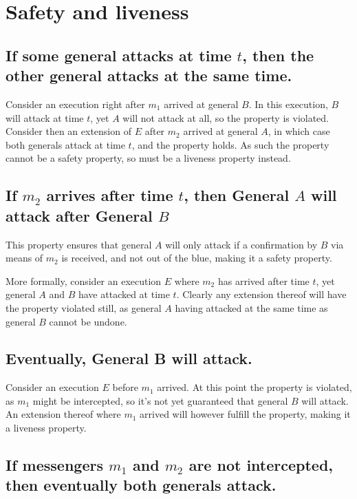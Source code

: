 \documentclass[a4paper]{scrreprt}
\begin{document}
\section{Safety and liveness}
\label{seq:safety_liveness}

\subsection{If some general attacks at time $t$, then the other general attacks at the same time.}
\label{seq:liveness_property}

Consider an execution right after $m_1$ arrived at general $B$. In this
execution, $B$ will attack at time $t$, yet $A$ will not attack at all, so the
property is violated. Consider then an extension of $E$ after $m_2$ arrived at
general $A$, in which case both generals attack at time $t$, and the property
holds. As such the property cannot be a safety property, so must be a liveness
property instead.

\subsection{If $m_2$ arrives after time $t$, then General $A$ will attack after General $B$}
\label{seq:no_unconfirmed_attack_safety}

This property ensures that general $A$ will only attack if a confirmation by
$B$ via means of $m_2$ is received, and not out of the blue, making it a safety
property.

More formally, consider an execution $E$ where $m_2$ has arrived after time
$t$, yet general $A$ and $B$ have attacked at time $t$. Clearly any extension
thereof will have the property violated still, as general $A$ having attacked
at the same time as general $B$ cannot be undone.

\subsection{Eventually, General B will attack.}

Consider an execution $E$ before $m_1$ arrived. At this point the property is
violated, as $m_1$ might be intercepted, so it's not yet guaranteed that
general $B$ will attack. An extension thereof where $m_1$ arrived will however
fulfill the property, making it a liveness property.

\subsection{If messengers $m_1$ and $m_2$ are not intercepted, then eventually both generals attack.}
\label{seq:safety_property}
\end{document}
